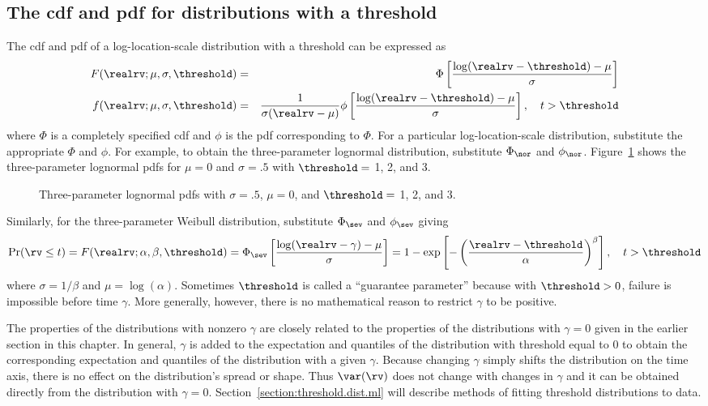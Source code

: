 \subsection{The cdf and pdf for distributions with a threshold}
\label{section:threshold.cdf}
The cdf and pdf of a log-location-scale distribution with
a threshold can be expressed as 
\begin{eqnarray}
 F(\realrv;\mu, \sigma,\threshold)&=&
\Phi\left [\frac{\log(\realrv-\threshold)-\mu}{\sigma}
\right ]
\\
f(\realrv;\mu, \sigma,\threshold)&=&
\frac{1}
     {\sigma (\realrv-\mu)}
\phi\left [\frac{\log(\realrv-\threshold)-\mu}{\sigma}
\right ], \quad t > \threshold 
\end{eqnarray}
where $\Phi$ is a completely specified cdf
and $\phi$ is the pdf corresponding to $\Phi$.
For a particular log-location-scale distribution, substitute 
the appropriate $\Phi$ and $\phi$. For example,
to obtain the three-parameter lognormal
distribution, substitute $\Phi_{\nor}$ and
$\phi_{\nor}$.
Figure~\ref{figure:threshold.shift.ps} shows the
three-parameter lognormal pdfs for $\mu=0$ and
$\sigma=.5$ with $\threshold=$ 1, 2, and 3.
\begin{figure}
\caption{Three-parameter lognormal
pdfs with $\sigma=.5$, $\mu=0$,
and $\threshold=$ 1, 2, and 3.}
\label{figure:threshold.shift.ps}
\end{figure}
Similarly, for the three-parameter Weibull 
distribution, substitute $\Phi_{\sev}$ and
$\phi_{\sev}$ giving
\begin{displaymath}
 \Pr(\rv \le t)=F(\realrv;\alpha, \beta,\threshold)=\Phi_{\sev}\left [\frac{\log(\realrv-\gamma)-\mu}{\sigma}
\right ]=1-
\exp \left [-\left (\frac{\realrv-\threshold}{\alpha} \right )^{\beta}
\right ], \quad t > \threshold
\end{displaymath}
where $\sigma=1/\beta$ and $\mu=\log(\alpha)$.  Sometimes
$\threshold$ is called a ``guarantee parameter'' because with
$\threshold > 0$, failure is impossible before time $\gamma$. More
generally, however, there is no mathematical reason to restrict
$\gamma$ to be positive.


The properties of the distributions with nonzero $\gamma$ are
closely related to the properties of the distributions with
$\gamma=0$ given in the earlier section in this chapter. In general,
$\gamma$ is added to the expectation and quantiles of the
distribution with threshold equal to $0$ to obtain the corresponding
expectation and quantiles of the distribution with a given $\gamma$.
Because changing $\gamma$ simply shifts the distribution on the time
axis, there is no effect on the distribution's spread or shape. Thus
$\var(\rv)$ does not change with changes in $\gamma$ and it can be
obtained directly from the distribution with $\gamma=0$.
Section~\ref{section:threshold.dist.ml} will describe methods of
fitting threshold distributions to data.

